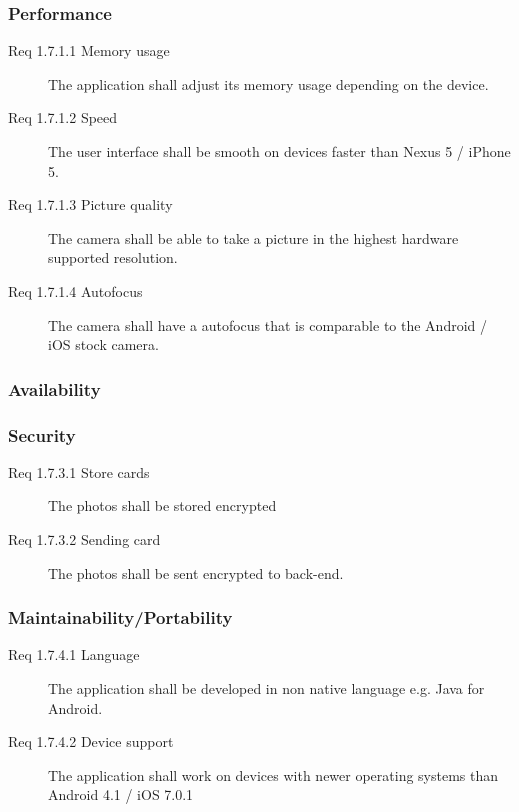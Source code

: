 \subsubsection{Performance}
\begin{description}
	\item[Req 1.7.1.1 Memory usage] The application shall adjust its memory usage depending on the device.
	\item[Req 1.7.1.2 Speed] The user interface shall be smooth on devices faster than Nexus 5 / iPhone 5.
	\item[Req 1.7.1.3 Picture quality] The camera shall be able to take a picture in the highest hardware supported resolution. 
	\item[Req 1.7.1.4 Autofocus] The camera shall have a autofocus that is comparable to the Android / iOS stock camera. 
\end{description}
\subsubsection{Availability}
\subsubsection{Security}
\begin{description}
	\item[Req 1.7.3.1 Store cards] The photos shall be stored encrypted
	\item[Req 1.7.3.2 Sending card] The photos shall be sent encrypted to back-end.
\end{description}
\subsubsection{Maintainability/Portability}
\begin{description}
	\item[Req 1.7.4.1 Language] The application shall be developed in non native language e.g. Java for Android. 
	\item[Req 1.7.4.2 Device support] The application shall work on devices with newer operating systems than Android 4.1 / iOS 7.0.1
\end{description}

